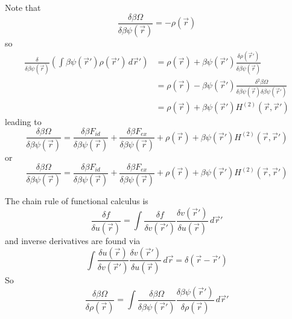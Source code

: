 \documentclass[12pt]{report}
\begin{document}
Note that
\begin{equation*}
  \frac{\delta\beta\Omega}{\delta\beta\psi(\vec{r})} =
  - \rho(\vec{r})
\end{equation*}
so
\begin{equation*}
  \begin{aligned}
    \frac{\delta}{\delta\beta\psi(\vec{r})}
    \left(
    \int \beta\psi(\vec{r}') \rho(\vec{r}') \, d\vec{r}'
    \right)
    &=
    \rho(\vec{r}) +
    \beta\psi(\vec{r}') \frac{\delta \rho(\vec{r}')}{\delta\beta\psi(\vec{r})} \\
    &=
    \rho(\vec{r}) -
    \beta\psi(\vec{r}')
    \frac{\delta^2 \beta\Omega}{\delta\beta\psi(\vec{r})\delta\beta\psi(\vec{r}')} \\
    &=
    \rho(\vec{r}) +
    \beta\psi(\vec{r}') H^{(2)}(\vec{r}, \vec{r}')
  \end{aligned}
\end{equation*}
leading to
\begin{equation}
  \frac{\delta\beta \Omega}{\delta\beta\psi(\vec{r})} =
  \frac{\delta\beta F_{id}}{\delta\beta\psi(\vec{r})} +
  \frac{\delta\beta F_{ex}}{\delta\beta\psi(\vec{r})} +
  \rho(\vec{r}) +
  \beta\psi(\vec{r}') H^{(2)}(\vec{r}, \vec{r}')
\end{equation}
or
\begin{equation}
  \frac{\delta\beta \Omega}{\delta\beta\psi(\vec{r})} =
  \frac{\delta\beta F_{id}}{\delta\beta\psi(\vec{r})} +
  \frac{\delta\beta F_{ex}}{\delta\beta\psi(\vec{r})} +
  \rho(\vec{r}) +
  \beta\psi(\vec{r}') H^{(2)}(\vec{r}, \vec{r}')
\end{equation}

The chain rule of functional calculus is
\begin{equation*}
  \frac{\delta f}{\delta u(\vec{r})} =
  \int
  \frac{\delta f}{\delta v(\vec{r}')}
  \frac{\delta v(\vec{r}')}{\delta u(\vec{r})}
  \, d\vec{r}'
\end{equation*}
and inverse derivatives are found via
\begin{equation*}
  \int
  \frac{\delta u(\vec{r})}{\delta v(\vec{r}')}
  \frac{\delta v(\vec{r}')}{\delta u(\vec{r})}
  \, d\vec{r} =
  \delta(\vec{r} - \vec{r}')
\end{equation*}
So
\begin{equation*}
  \frac{\delta\beta\Omega}{\delta\rho(\vec{r})} =
  \int
  \frac{\delta\beta\Omega}{\delta\beta\psi(\vec{r}')}
  \frac{\delta\beta\psi(\vec{r}')}{\delta\rho(\vec{r})}
  \, d\vec{r}'
\end{equation*}
\end{document}
